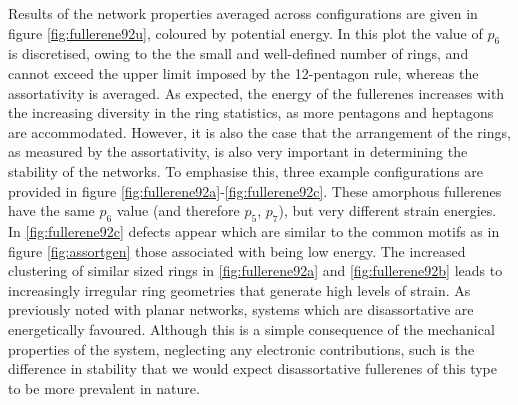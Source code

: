 Results of the network properties averaged across configurations are given in figure \ref{fig:fullerene92u}, coloured by potential energy.
In this plot the value of $p_6$ is discretised, owing to the the small and well\--defined number of rings, and cannot exceed the upper limit imposed by the 12\--pentagon rule, whereas the assortativity is averaged.
As expected, the energy of the fullerenes increases with the increasing diversity in the ring statistics, as more pentagons and heptagons are accommodated.
However, it is also the case that the arrangement of the rings, as measured by the assortativity, is also very important in determining the stability of the networks.
To emphasise this, three example configurations are provided in figure \ref{fig:fullerene92a}\--\ref{fig:fullerene92c}.
These amorphous fullerenes have the same $p_6$ value (and therefore $p_5$, $p_7$), but very different strain energies.
In \ref{fig:fullerene92c} defects appear which are similar to the common motifs as in figure \ref{fig:assortgen} \ie{} those associated with being low energy.
The increased clustering of similar sized rings in \ref{fig:fullerene92a} and \ref{fig:fullerene92b} leads to increasingly irregular ring geometries that generate high levels of strain.
As previously noted with planar networks, systems which are disassortative are energetically favoured.
Although this is a simple consequence of the mechanical properties of the system, neglecting any electronic contributions, such is the difference in stability that we would expect disassortative fullerenes of this type to be more prevalent in nature.


